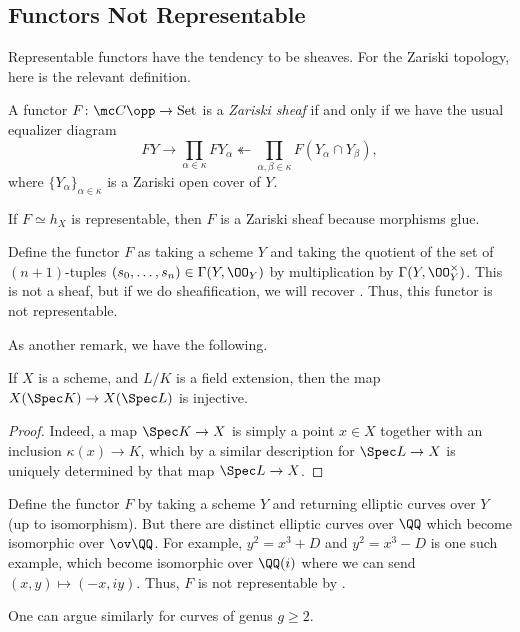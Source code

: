 \documentclass{article}
\begin{document}
\subsection{Functors Not Representable}
Representable functors have the tendency to be sheaves. For the Zariski topology, here is the relevant definition.
\begin{definition}
	A functor $F\colon\mc C\opp\to\mathrm{Set}$ is a \textit{Zariski sheaf} if and only if we have the usual equalizer diagram
	\[FY\to\prod_{\alpha\in\kappa}FY_\alpha\twoheadleftarrow\prod_{\alpha,\beta\in\kappa}F(Y_\alpha\cap Y_\beta),\]
	where $\{Y_\alpha\}_{\alpha\in\kappa}$ is a Zariski open cover of $Y$.
\end{definition}
\begin{example}
	If $F\simeq h_X$ is representable, then $F$ is a Zariski sheaf because morphisms glue.
\end{example}
\begin{nex}
	Define the functor $F$ as taking a scheme $Y$ and taking the quotient of the set of $(n+1)$-tuples $(s_0,\ldots,s_n)\in\Gamma(Y,\OO_Y)$ by multiplication by $\Gamma(Y,\OO_Y^\times)$. This is not a sheaf, but if we do sheafification, we will recover . Thus, this functor is not representable.
\end{nex}
As another remark, we have the following.
\begin{lemma} \label{lem:field-extension-rep}
	If $X$ is a scheme, and $L/K$ is a field extension, then the map $X(\Spec K)\to X(\Spec L)$ is injective.
\end{lemma}
\begin{proof}
	Indeed, a map $\Spec K\to X$ is simply a point $x\in X$ together with an inclusion $\kappa(x)\to K$, which by a similar description for $\Spec L\to X$ is uniquely determined by that map $\Spec L\to X$.
\end{proof}
\begin{example}
	Define the functor $F$ by taking a scheme $Y$ and returning elliptic curves over $Y$ (up to isomorphism). But there are distinct elliptic curves over $\QQ$ which become isomorphic over $\ov\QQ$. For example, $y^2=x^3+D$ and $y^2=x^3-D$ is one such example, which become isomorphic over $\QQ(i)$ where we can send $(x,y)\mapsto(-x,iy)$. Thus, $F$ is not representable by .
\end{example}
\begin{remark}
	One can argue similarly for curves of genus $g\ge2$.
\end{remark}
\end{document}
